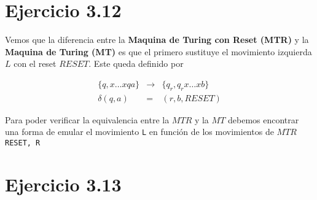 \documentclass[11pt]{article}
\begin{document}
	\begin{quote}
		
	\end{quote}









\section*{Ejercicio 3.12}

	\par Vemos que la diferencia entre la \textbf{Maquina de Turing con Reset (MTR)} y la \textbf{Maquina de Turing (MT)} es que el primero sustituye el movimiento izquierda $L$ con el reset $RESET$. Este queda definido por
	
	\begin{eqnarray*}
		\{q, x\dots xqa\} &\rightarrow& \{q_r, q_rx\dots xb\} \\
		\delta(q,a) &=& (r,b,RESET)
	\end{eqnarray*}
	
	\par Para poder verificar la equivalencia entre la $MTR$ y la $MT$ debemos encontrar una forma de emular el movimiento \verb|L| en funci\'on de los movimientos de $MTR$ \verb|RESET, R|

	\begin{quote}
		
	\end{quote}








\section*{Ejercicio 3.13}
\end{document}
